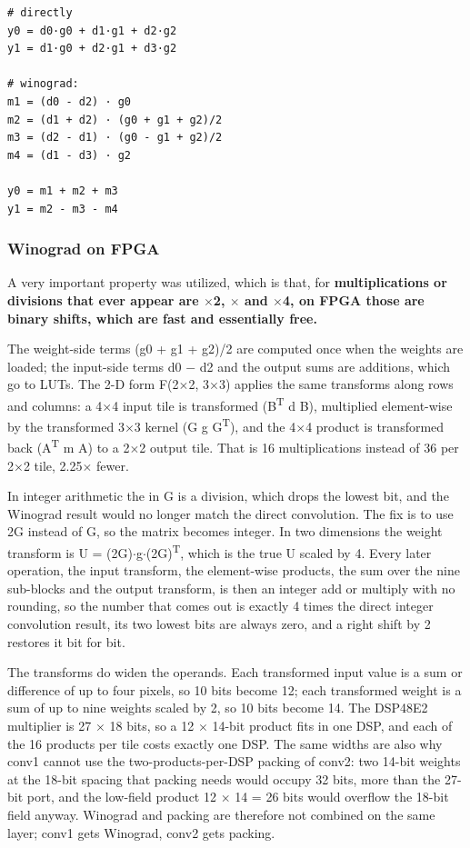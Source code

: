 \begin{lstlisting}[language={}]
# directly
y0 = d0·g0 + d1·g1 + d2·g2
y1 = d1·g0 + d2·g1 + d3·g2

# winograd: 
m1 = (d0 - d2) · g0
m2 = (d1 + d2) · (g0 + g1 + g2)/2
m3 = (d2 - d1) · (g0 - g1 + g2)/2
m4 = (d1 - d3) · g2

y0 = m1 + m2 + m3
y1 = m2 - m3 - m4
\end{lstlisting}

\subsubsection{Winograd on FPGA}\label{sec:4.3.2}

A very important property was utilized, which is that, for \textbf{multiplications or divisions that ever appear are $\times$2, $\times$\textonehalf{} and $\times$4, on FPGA those are binary shifts, which are fast and essentially free.}

The weight-side terms (g0 + g1 + g2)/2 are computed once when the weights are loaded; the input-side terms d0 $-$ d2 and the output sums are additions, which go to LUTs. The 2-D form F(2$\times$2, 3$\times$3) applies the same transforms along rows and columns: a 4$\times$4 input tile is transformed (B\textsuperscript{T} d B), multiplied element-wise by the transformed 3$\times$3 kernel (G g G\textsuperscript{T}), and the 4$\times$4 product is transformed back (A\textsuperscript{T} m A) to a 2$\times$2 output tile. That is 16 multiplications instead of 36 per 2$\times$2 tile, 2.25$\times$ fewer.

In integer arithmetic the \textonehalf{} in G is a division, which drops the lowest bit, and the Winograd result would no longer match the direct convolution. The fix is to use 2G instead of G, so the matrix becomes integer. In two dimensions the weight transform is U = (2G)$\cdot$g$\cdot$(2G)\textsuperscript{T}, which is the true U scaled by 4. Every later operation, the input transform, the element-wise products, the sum over the nine sub-blocks and the output transform, is then an integer add or multiply with no rounding, so the number that comes out is exactly 4 times the direct integer convolution result, its two lowest bits are always zero, and a right shift by 2 restores it bit for bit.

The transforms do widen the operands. Each transformed input value is a sum or difference of up to four pixels, so 10 bits become 12; each transformed weight is a sum of up to nine weights scaled by 2, so 10 bits become 14. The DSP48E2 multiplier is 27 $\times$ 18 bits, so a 12 $\times$ 14-bit product fits in one DSP, and each of the 16 products per tile costs exactly one DSP. The same widths are also why conv1 cannot use the two-products-per-DSP packing of conv2: two 14-bit weights at the 18-bit spacing that packing needs would occupy 32 bits, more than the 27-bit port, and the low-field product 12 $\times$ 14 = 26 bits would overflow the 18-bit field anyway. Winograd and packing are therefore not combined on the same layer; conv1 gets Winograd, conv2 gets packing.

